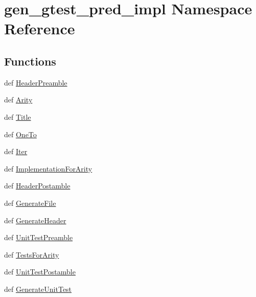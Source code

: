\hypertarget{namespacegen__gtest__pred__impl}{\section{gen\-\_\-gtest\-\_\-pred\-\_\-impl Namespace Reference}
\label{namespacegen__gtest__pred__impl}
}
\subsection*{Functions}
\begin{DoxyCompactItemize}
\item 
def \hyperlink{namespacegen__gtest__pred__impl_a94611cbb902fe725a0c566bd0d9c0817}{Header\-Preamble}
\item 
def \hyperlink{namespacegen__gtest__pred__impl_a017b437499e68412572fc726edf8ddd2}{Arity}
\item 
def \hyperlink{namespacegen__gtest__pred__impl_a629029b6fef00578cb886c7eca25cf67}{Title}
\item 
def \hyperlink{namespacegen__gtest__pred__impl_a369482efbd71b1ddf21a4a520e8769b4}{One\-To}
\item 
def \hyperlink{namespacegen__gtest__pred__impl_a230080bd07390d99521308904d7f6e3c}{Iter}
\item 
def \hyperlink{namespacegen__gtest__pred__impl_a7334eb8b396d40c01c9bbd64a63c8ce1}{Implementation\-For\-Arity}
\item 
def \hyperlink{namespacegen__gtest__pred__impl_a3741b573bde4a614f34aa55587292c5f}{Header\-Postamble}
\item 
def \hyperlink{namespacegen__gtest__pred__impl_a996717114b48d38f2ff2722070d70188}{Generate\-File}
\item 
def \hyperlink{namespacegen__gtest__pred__impl_a7392ee5b86f41d4c66fd496ac5e53da2}{Generate\-Header}
\item 
def \hyperlink{namespacegen__gtest__pred__impl_ad34b57e3bcbd48ecc394398a7b71b267}{Unit\-Test\-Preamble}
\item 
def \hyperlink{namespacegen__gtest__pred__impl_a6e2865e6f6be1dd3a691320e1e8fda0f}{Tests\-For\-Arity}
\item 
def \hyperlink{namespacegen__gtest__pred__impl_a610d36b8a024985a2a80f9244eb61902}{Unit\-Test\-Postamble}
\item 
def \hyperlink{namespacegen__gtest__pred__impl_af6ebf6710b82cd16112ecdf75a751952}{Generate\-Unit\-Test}
\end{DoxyCompactItemize}
